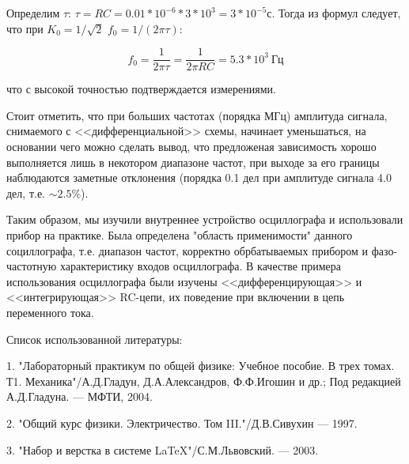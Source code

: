 \documentclass[14pt]{article}
\begin{document}
Определим $\tau$: $\tau = RC = 0.01*10^{-6}*3*10^{3} = 3*10^{-5}$с. Тогда из формул следует, что при $K_0 = 1/\sqrt{2}$ $f_0 = 1/(2\pi\tau)$:

$$f_0 = \frac{1}{2\pi\tau} = \frac{1}{2\pi RC} = 5.3*10^3~\text{Гц}$$

\noindent что с высокой точностью подтверждается измерениями.

Стоит отметить, что при больших частотах (порядка МГц) амплитуда сигнала, снимаемого с <<дифференциальной>> схемы, начинает уменьшаться, на основании чего можно сделать вывод, что предложеная зависимость хорошо выполняется лишь в некотором диапазоне частот, при выходе за его границы наблюдаются заметные отклонения (порядка 0.1 дел при амплитуде сигнала 4.0 дел, т.е. $\sim 2.5\%$).

\vspace{1cm}
Таким образом, мы изучили внутреннее устройство осциллографа и использовали прибор на практике. Была определена "область применимости" данного социллографа, т.е. диапазон частот, корректно обрбатываемых прибором и фазо-частотную характеристику входов осциллографа. В качестве примера использования осциллографа были изучены <<дифференцирующая>> и <<интегрирующая>> RC-цепи, их поведение при включении в цепь переменного тока. 


\newpage
Список использованной литературы:
	
\vspace{0.5cm}
1. "Лабораторный практикум по общей физике: Учебное пособие. В трех томах. Т1. Механика"/А.Д.Гладун, Д.А.Александров,
Ф.Ф.Игошин и др.; Под редакцией А.Д.Гладуна. --- МФТИ, 2004.

2. "Общий курс физики. Электричество. Том III."/Д.В.Сивухин --- 1997.
	
3. "Набор и верстка в системе \LaTeX "/С.М.Львовский. --- 2003.
\end{document}
